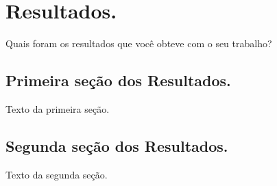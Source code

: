 \chapter{Resultados.}

Quais foram os resultados que você obteve com o seu trabalho?

\section{Primeira seção dos Resultados.}

Texto da primeira seção.

\section{Segunda seção dos Resultados.}

Texto da segunda seção.
